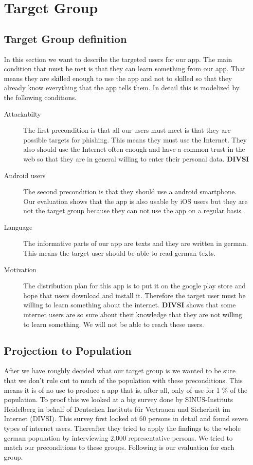 \section{Target Group}
\label{s:target_group}

\subsection{Target Group definition}
In this section we want to describe the targeted users for our app.
The main condition that must be met is that they can learn something from our app.
That means they are skilled enough to use the app and not to skilled so that they already know everything that the app tells them.
In detail this is modelized by the following conditions.
\begin{description}
\item[Attackabilty] The first precondition is that all our users must meet is that they are possible targets for phishing.
This means they must use the Internet.
They also should use the Internet often enough and have a common trust in the web so that they are in general willing to enter their personal data.
\textbf{DIVSI}
\item[Android users] The second precondition is that they should use a android smartphone.
Our evaluation shows that the app is also usable by iOS users but they are not the target group because they can not use the app on a regular basis.
\item[Language] The informative parts of our app are texts and they are written in german.
This means the target user should be able to read german texts.
\item[Motivation] The distribution plan for this app is to put it on the google play store and hope that users download and install it.
Therefore the target user must be willing to learn something about the internet.
\textbf{DIVSI} shows that some internet users are so sure about their knowledge that they are not willing to learn something.
We will not be able to reach these users.
\end{description}

\subsection{Projection to Population}
After we have roughly decided what our target group is we wanted to be sure that we don't rule out to much of the population with these preconditions.
This means it is of no use to produce a app that is, after all, only of use for 1 \% of the population.
To proof this we looked at a big survey done by SINUS-Instituts Heidelberg in behalf of Deutschen Instituts für Vertrauen und Sicherheit im Internet (DIVSI).
This survey first looked at 60 persons in detail and found seven types of internet users.
Thereafter they tried to apply the findings to the whole german population by interviewing 2,000 representative persons.
We tried to match our preconditions to these groups. Following is our evaluation for each group.

